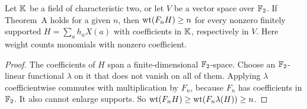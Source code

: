 \begin{corollary}\label{cor:char2}
Let $\mathbb{K}$ be a field of characteristic two, or let $V$ be a vector space over $\mathbb{F}_2$. If Theorem~A holds for a given $n$, then $\operatorname{wt}(F_nH)\ge n$ for every nonzero finitely supported $H=\sum_a h_aX(a)$ with coefficients in $\mathbb{K}$, respectively in $V$. Here weight counts monomials with nonzero coefficient.
\end{corollary}

\begin{proof}
The coefficients of $H$ span a finite-dimensional $\mathbb{F}_2$-space. Choose an $\mathbb{F}_2$-linear functional $\lambda$ on it that does not vanish on all of them. Applying $\lambda$ coefficientwise commutes with multiplication by $F_n$, because $F_n$ has coefficients in $\mathbb{F}_2$. It also cannot enlarge supports. So $\operatorname{wt}(F_nH)\ge\operatorname{wt}(F_n\lambda(H))\ge n$.
\end{proof}
